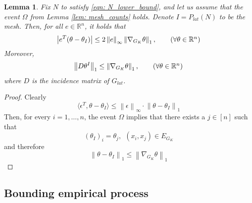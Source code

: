 \documentclass{article}
\newcommand{\Reals}{\mathbb{R}}
\newcommand{\norm}[1]{\left\lVert#1\right\rVert}
\newcommand{\abs}[1]{\left \lvert #1 \right \rvert}
\newcommand{\dotp}[2]{\langle #1, #2 \rangle}
\newcommand{\1}{\mathbb{I}}
\theoremstyle{alden}
\theoremstyle{aldenthm}
\newtheorem{lemma}{Lemma}
\theoremstyle{definition}
\theoremstyle{remark}
\begin{document}
\begin{lemma}
	\label{lem: quantization_error}
	Fix $N$ to satisfy \eqref{eqn: N_lower_bound}, and let us assume that the event $\Omega$ from Lemma \ref{lem: mesh_counts} holds. Denote $I = P_{lat}(N)$ to be the mesh. Then, for all $e \in \Reals^n$, it holds that
	\begin{equation*}
	\abs{e^T(\theta - \theta_I)} \leq 2 \norm{e}_{\infty} \norm{\nabla_{G_K} \theta}_1, \tag{$\forall \theta \in \Reals^n$}
	\end{equation*}
	Moreover, 
	\begin{equation*}
	\norm{D \theta^I}_1 \leq \norm{\nabla_{G_K} \theta}_1, \tag{$\forall \theta \in \Reals^n$}
	\end{equation*}
	where $D$ is the incidence matrix of $G_{lat}$.
\end{lemma}
\begin{proof}
	Clearly
	\begin{equation*}
	\dotp{\epsilon^T}{\theta - \theta_{I}} \leq \norm{\epsilon}_{\infty} \cdot \norm{\theta - \theta_I}_1
	\end{equation*}
	Then, for every $i = 1, \ldots, n$, the event $\Omega$ implies that there exists a $j \in [n]$ such that
	\begin{equation*}
	(\theta_I)_i = \theta_j,~~ (x_i,x_j) \in E_{G_K}
	\end{equation*}
	and therefore
	\begin{equation*}
	\norm{\theta - \theta_I}_1 \leq \norm{\nabla_{G_K} \theta}_1
	\end{equation*}
\end{proof}

\subsection{Bounding empirical process}
\end{document}
